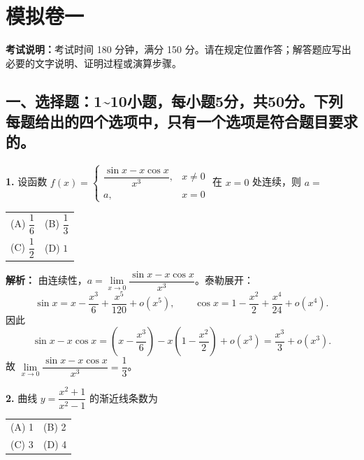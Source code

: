 

\section{模拟卷一}

\noindent\textbf{考试说明：}考试时间 180 分钟，满分 150 分。请在规定位置作答；解答题应写出必要的文字说明、证明过程或演算步骤。

\subsection*{一、选择题：1\textasciitilde10小题，每小题5分，共50分。下列每题给出的四个选项中，只有一个选项是符合题目要求的。}

\textbf{1.} 设函数 $f(x)=\begin{cases} \dfrac{\sin x - x\cos x}{x^3}, & x \neq 0 \\ a, & x=0 \end{cases}$ 在 $x=0$ 处连续，则 $a=$
\begin{center}
\begin{tabular}{ll}
(A) $\dfrac{1}{6}$ & (B) $\dfrac{1}{3}$ \\[6pt]
(C) $\dfrac{1}{2}$ & (D) $1$
\end{tabular}
\end{center}

\ifshowsolutions\par\noindent\textbf{解析：} 由连续性，$a = \lim\limits_{x \to 0} \dfrac{\sin x - x\cos x}{x^3}$。泰勒展开：
\[
\sin x=x-\frac{x^3}{6}+\frac{x^5}{120}+o(x^5),
\qquad
\cos x=1-\frac{x^2}{2}+\frac{x^4}{24}+o(x^4).
\]
因此
\[
\sin x-x\cos x
=\left(x-\frac{x^3}{6}\right)-x\left(1-\frac{x^2}{2}\right)+o(x^3)
=\frac{x^3}{3}+o(x^3).
\]
故 $\lim\limits_{x \to 0} \dfrac{\sin x - x\cos x}{x^3} = \dfrac{1}{3}$。\else \answerarea \fi

\vspace{8pt}

\textbf{2.} 曲线 $y = \dfrac{x^2 + 1}{x^2 - 1}$ 的渐近线条数为
\begin{center}
\begin{tabular}{ll}
(A) 1 & (B) 2 \\[6pt]
(C) 3 & (D) 4
\end{tabular}
\end{center}

